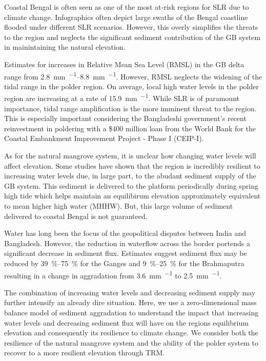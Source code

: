 \documentclass[9pt,twocolumn,twoside,lineno]{pnas-new}
\begin{document}
Coastal Bengal is often seen as one of the most at-risk regions for SLR due to climate change. Infographics often depict large swaths of the Bengal coastline flooded under different SLR scenarios. However, this overly simplifies the threats to the region and neglects the significant sediment contribution of the GB system in mainintaining the natural elevation.

Estimates for increases in Relative Mean Sea Level (RMSL) in the GB delta range from \SIrange{2.8}{8.8}{\milli\meter\per\year}. However, RMSL neglects the widening of the tidal range in the polder region. On average, local high water levels in the polder region are increasing at a rate of \SI{15.9}{\milli\meter\per\year}\cite{pethickRapidRiseEffective2013}. While SLR is of paramount importance, tidal range amplification is the more imminent threat to the region. This is especially important considering the Bangladeshi government's recent reinvestment in poldering with a \$400 million loan from the World Bank for the Coastal Embankment Improvement Project - Phase I (CEIP-I).

As for the natural mangrove system, it is unclear how changing water levels will affect elevation. Some studies have shown that the region is incredibly resilient to increasing water levels due, in large part, to the abudant sediment supply of the GB system. This sediment is delivered to the platform periodically during spring high tide which helps maintain an equilibirum elevation approximately equivalent to mean higher high water (MHHW). But, this large volume of sediment delivered to coastal Bengal is not guaranteed.

Water has long been the focus of the geopolitical disputes between India and Bangladesh. However, the reduction in waterflow across the border portends a significant decrease in sediment flux. Estimates suggest sediment flux may be reduced by \SIrange{39}{75}{\percent} for the Ganges and \SIrange{9}{25}{\percent} for the Brahmaputra resulting in a change in aggradation from \SI{3.6}{\milli\meter\per\year} to \SI{2.5}{\milli\meter\per\year}\cite{higginsRiverLinkingIndia2018}.

The combination of increasing water levels and decreasing sediment supply may further intensify an already dire situation. Here, we use a zero-dimensional mass balance model of sediment aggradation to understand the impact that increasing water levels and decreasing sediment flux will have on the regions equilibrium elevation and consequently its resilience to climate change. We consider both the resilience of the natural mangrove system and the ability of the polder system to recover to a more resilient elevation through TRM.
\end{document}
